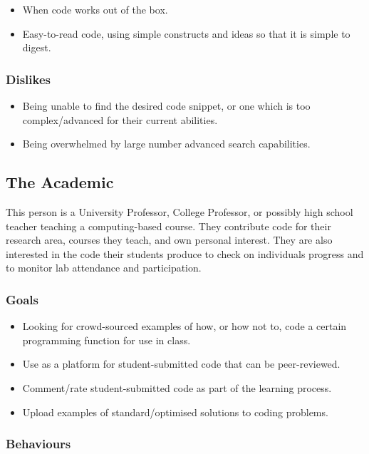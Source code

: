 \documentclass[11pt,a4paper]{article}
\begin{document}
\begin{itemize}
\item When code works out of the box.
\item Easy-to-read code, using simple constructs and ideas so that it
is simple to digest.
\end{itemize}

\subsubsection{Dislikes}

\begin{itemize}
\item Being unable to find the desired code snippet, or one which is
too complex/advanced for their current abilities.
\item Being overwhelmed by large number advanced search capabilities.
\end{itemize}

\newpage

\subsection{The Academic}

This person is a University Professor, College Professor, or possibly high
school teacher teaching a computing-based course. They contribute code for
their research area, courses they teach, and own personal interest. They are
also interested in the code their students produce to check on individuals
progress and to monitor lab attendance and participation.

\subsubsection{Goals}

\begin{itemize}
\item Looking for crowd-sourced examples of how, or how not to, code a certain
programming function for use in class.
\item Use as a platform for student-submitted code that can be peer-reviewed.
\item Comment/rate student-submitted code as part of the learning process.
\item Upload examples of standard/optimised solutions to coding problems.
\end{itemize}

\subsubsection{Behaviours}
\end{document}
